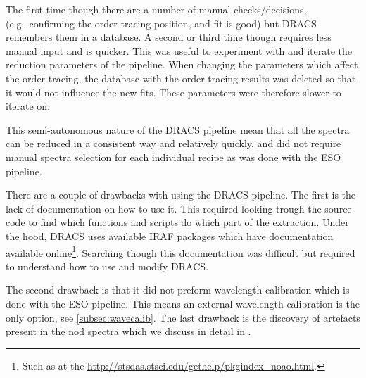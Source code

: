 The first time though there are a number of manual checks/decisions, (e.g.\ confirming the order tracing position, and fit is good) but DRACS remembers them in a database. A second or third time though requires less manual input and is quicker. This was useful to experiment with and iterate the reduction parameters of the pipeline. When changing the parameters which affect the order tracing, the database with the order tracing results was deleted so that it would not influence the new fits. These parameters were therefore slower to iterate on.

This semi-autonomous nature of the DRACS pipeline mean that all the spectra can be reduced in a consistent way and relatively quickly, and did not require manual spectra selection for each individual recipe as was done with the ESO pipeline.

There are a couple of drawbacks with using the DRACS pipeline. The first is the lack of documentation on how to use it. This required looking trough the source code to find which functions and scripts do which part of the extraction. Under the hood, DRACS uses available IRAF packages which have documentation available online\footnote{Such as at the \href{Space Telescope Science Institute}{http://stsdas.stsci.edu/gethelp/pkgindex\_noao.html}.}. Searching though this documentation was difficult but required to understand how to use and modify DRACS.

The second drawback is that it did not preform wavelength calibration which is done with the ESO pipeline. This means an external wavelength calibration is the only option, see \ref{subsec:wavecalib}. The last drawback is the discovery of artefacts present in the nod spectra which we discuss in detail in
.

